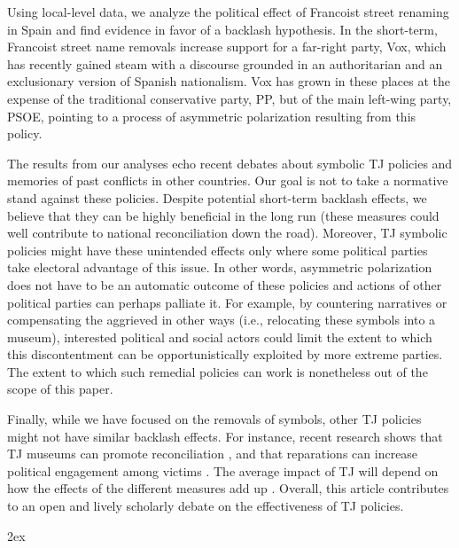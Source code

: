 \documentclass[12pt, titlepage]{article}
\begin{document}
Using local-level data, we analyze the political effect of Francoist street renaming in Spain and find evidence in favor of a backlash hypothesis. In the short-term, Francoist street name removals increase support for a far-right party, Vox, which has recently gained steam with a discourse grounded in an authoritarian and an exclusionary version of Spanish nationalism. Vox has grown in these places at the expense of the traditional conservative party, PP, but of the main left-wing party, PSOE, pointing to a process of asymmetric polarization resulting from this policy.

The results from our analyses echo recent debates about symbolic TJ policies and memories of past conflicts in other countries. Our goal is not to take a normative stand against these policies. Despite potential short-term backlash effects, we believe that they can be highly beneficial in the long run (these measures could well contribute to national reconciliation down the road). Moreover, TJ symbolic policies might have these unintended effects only where some political parties take electoral advantage of this issue. In other words, asymmetric polarization does not have to be an automatic outcome of these policies and actions of other political parties can perhaps palliate it. For example, by countering narratives or compensating the aggrieved in other ways (i.e., relocating these symbols into a museum), interested political and social actors could limit the extent to which this discontentment can be opportunistically exploited by more extreme parties. The extent to which such remedial policies can work is nonetheless out of the scope of this paper.

Finally, while we have focused on the removals of symbols, other TJ policies might not have similar backlash effects. For instance, recent research shows that TJ museums can promote reconciliation \citep{Balcells:2020aa}, and that reparations can increase political engagement among victims \citep{voytas:2021}. The average impact of TJ will depend on how the effects of the  different measures add up \citep{Olsen:2010aa, Loyle:2017aa}.
Overall, this article contributes to an open and lively scholarly debate on the effectiveness of TJ policies.

\newpage
\begingroup
\parindent 0pt
\parskip 2ex
\def\enotesize{\normalsize}
\theendnotes
\endgroup

\clearpage



%
\end{document}
